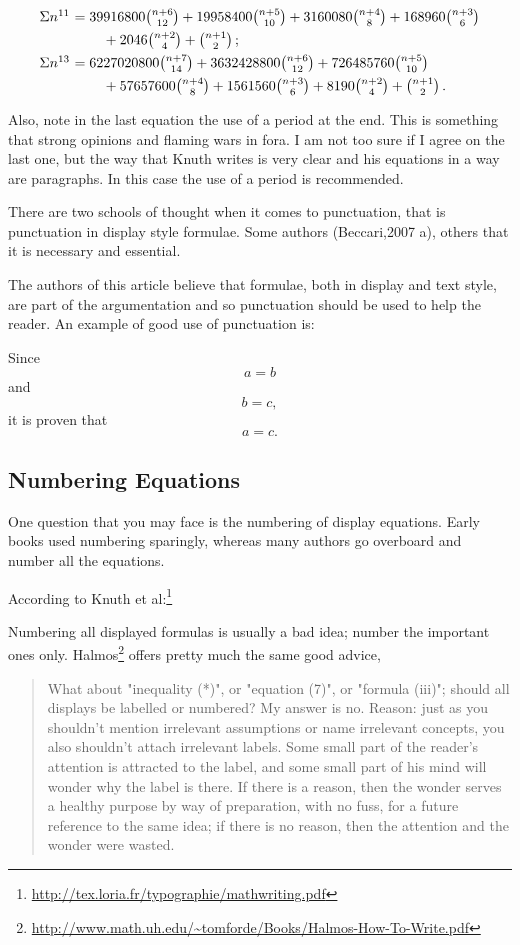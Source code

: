 {{
\[\vcenter{\halign{$#$\hfil\ &$#$\hfil\cr
\Sigma n^{11}&=39916800{n+6\choose 12}+
19958400{n+5\choose 10}+3160080{n+4\choose 8}
+168960{n+3\choose 6}\cr
\noalign{\smallskip}
&\qquad\null+2046{n+2\choose 4}+{n+1\choose 2}\,;\cr
\noalign{\smallskip}
\Sigma n^{13}&=6227020800{n+7\choose 14}+3632428800{n+6\choose 12}+
726485760{n+5\choose 10}\cr
\noalign{\smallskip}
&\qquad\null+57657600{n+4\choose 8}
+1561560{n+3\choose 6}+8190{n+2\choose 4}+{n+1\choose 2}\,.\cr}}\]
}

Also, note in the last equation the use of a period at the end. This is something that strong opinions and flaming wars in fora. I am not too sure if I agree on the last one, but the way that Knuth writes is very clear and his equations in a way are paragraphs. In this case the use of a period is recommended.



There are two schools of thought when it comes to punctuation, that is punctuation in display style formulae. Some authors (Beccari,2007 a), others that it is necessary and essential.

The authors of this article believe that formulae,
both in display and text style, are part of the argumentation
and so punctuation should be used to help
the reader. An example of good use of punctuation is:


Since
\[ a=b \]
and
\[b=c,\]
it is proven that
\[a =c. \]



\subsection{Numbering Equations}

One question that you may face is the numbering of display equations. Early books used numbering sparingly, whereas many authors go overboard and number all the equations.

According to Knuth et al:\footnote{\url{http://tex.loria.fr/typographie/mathwriting.pdf}}

Numbering all displayed formulas is usually a bad idea; number the important ones only.
Halmos\footnote{\url{http://www.math.uh.edu/~tomforde/Books/Halmos-How-To-Write.pdf}} offers pretty much the same good advice,

\begin{quotation}
What about "inequality (*)", or "equation (7)", or "formula (iii)"; should all displays be labelled or numbered? My answer is no. Reason: just as you shouldn't mention irrelevant assumptions or name irrelevant concepts, you also shouldn't attach irrelevant labels. Some small part of the reader's attention is attracted to the label, and some small part of his mind will wonder why the label is there. If there is a reason, then the wonder serves a healthy purpose by way of preparation, with no fuss, for a future reference to the same idea; if there is no reason, then the attention and the wonder were wasted.
\end{quotation}

}
